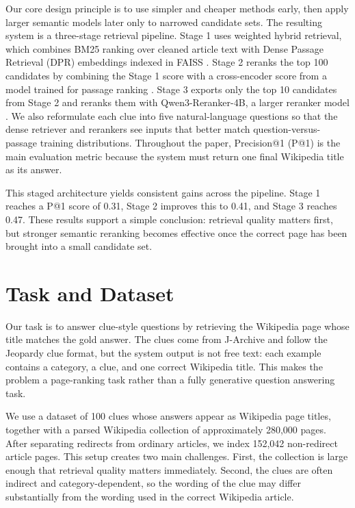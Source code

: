 \documentclass[11pt]{article}
\begin{document}
Our core design principle is to use simpler and cheaper methods early, then apply larger semantic models later only to narrowed candidate sets. The resulting system is a three-stage retrieval pipeline. Stage 1 uses weighted hybrid retrieval, which combines BM25 ranking over cleaned article text with Dense Passage Retrieval (DPR) embeddings \citep{karpukhin-etal-2020-dpr} indexed in FAISS \citep{johnson2019billion}. Stage 2 reranks the top 100 candidates by combining the Stage 1 score with a cross-encoder score from a model trained for passage ranking \citep{nogueira-cho-2019-passage}. Stage 3 exports only the top 10 candidates from Stage 2 and reranks them with Qwen3-Reranker-4B, a larger reranker model \citep{qwen3technicalreport}. We also reformulate each clue into five natural-language questions so that the dense retriever and rerankers see inputs that better match question-versus-passage training distributions. Throughout the paper, Precision@1 (P@1) is the main evaluation metric because the system must return one final Wikipedia title as its answer.

This staged architecture yields consistent gains across the pipeline. Stage 1 reaches a P@1 score of 0.31, Stage 2 improves this to 0.41, and Stage 3 reaches 0.47. These results support a simple conclusion: retrieval quality matters first, but stronger semantic reranking becomes effective once the correct page has been brought into a small candidate set.

\section{Task and Dataset}

Our task is to answer clue-style questions by retrieving the Wikipedia page whose title matches the gold answer. The clues come from J-Archive and follow the Jeopardy clue format, but the system output is not free text: each example contains a category, a clue, and one correct Wikipedia title. This makes the problem a page-ranking task rather than a fully generative question answering task.

We use a dataset of 100 clues whose answers appear as Wikipedia page titles, together with a parsed Wikipedia collection of approximately 280,000 pages. After separating redirects from ordinary articles, we index 152,042 non-redirect article pages. This setup creates two main challenges. First, the collection is large enough that retrieval quality matters immediately. Second, the clues are often indirect and category-dependent, so the wording of the clue may differ substantially from the wording used in the correct Wikipedia article.
\end{document}
